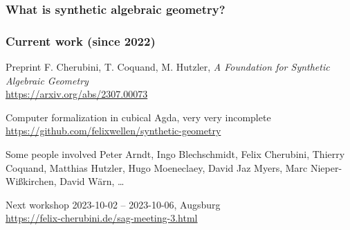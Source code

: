\documentclass[aspectratio=1610]{beamer}
\begin{document}
\begin{frame}
  \frametitle{What is synthetic algebraic geometry?}

  \center%
\end{frame}

\begin{frame}
  \frametitle{Current work (since 2022)}

  \begin{block}{Preprint}
    F. Cherubini, T. Coquand, M. Hutzler,
    \textit{A Foundation for Synthetic Algebraic Geometry}\\
    \url{https://arxiv.org/abs/2307.00073}
  \end{block}

  \begin{block}{Computer formalization}
    in cubical Agda, very very incomplete\\
    \url{https://github.com/felixwellen/synthetic-geometry}
  \end{block}

  \begin{block}{Some people involved}
    Peter Arndt,
    Ingo Blechschmidt,
    Felix Cherubini,
    Thierry Coquand,
    Matthias Hutzler,
    Hugo Moeneclaey,
    David Jaz Myers,
    Marc Nieper-Wißkirchen,
    David Wärn,
    \dots
  \end{block}

  \begin{block}{Next workshop}
    2023-10-02 -- 2023-10-06, Augsburg\\
    \url{https://felix-cherubini.de/sag-meeting-3.html}
  \end{block}
\end{frame}
\end{document}
